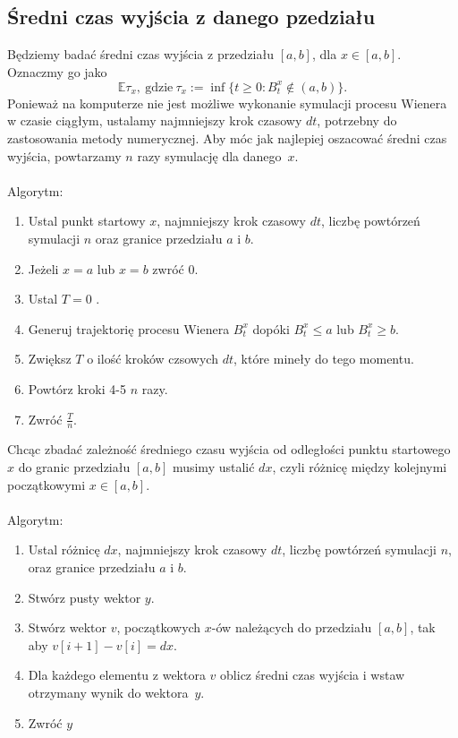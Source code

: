 \documentclass{article}
\theoremstyle{break}
\numberwithin{equation}{subsection}
\numberwithin{figure}{section}
\begin{document}
\subsection{Średni czas wyjścia z danego pzedziału}

Będziemy badać średni czas wyjścia z  przedziału $[a,b]$, dla $x\in[a,b]$. Oznaczmy go jako $$\mathbb{E}\tau_x \mathrm{,~gdzie~}\tau_x:=\inf\{t\geq0:B_t^x\notin(a,b)\}.$$ 
Ponieważ na komputerze nie jest możliwe wykonanie symulacji procesu Wienera w czasie ciągłym, ustalamy najmniejszy krok czasowy $dt$, potrzebny do zastosowania metody numerycznej. Aby móc jak najlepiej oszacować średni czas wyjścia, powtarzamy $n$ razy symulację dla danego~$x$.\\ \\
Algorytm:
\begin{enumerate}
	\item Ustal punkt startowy $x$, najmniejszy krok czasowy $dt$, liczbę powtórzeń symulacji $n$ oraz granice przedziału $a$ i $b$.
	\item Jeżeli $x=a$ lub $x=b$ zwróć 0.
	\item Ustal $T=0$ .
	\item Generuj trajektorię procesu Wienera $B_t^x$ dopóki $B_t^x\leq a$ lub $B_t^x\geq b$.
	\item Zwiększ $T$ o ilość kroków czsowych $dt$, które mineły do tego momentu.
	\item Powtórz kroki 4-5 $n$ razy.
	\item Zwróć $\frac{T}{n}$.
\end{enumerate}
Chcąc zbadać zależność średniego czasu wyjścia od odległości punktu startowego $x$ do granic przedziału $[a,b]$ musimy ustalić $dx$, czyli różnicę między kolejnymi początkowymi $x \in [a,b]$.\\ \\ 
Algorytm:
\begin{enumerate}
	\item Ustal różnicę $dx$, najmniejszy krok czasowy $dt$, liczbę powtórzeń symulacji $n$, oraz granice przedziału $a$ i $b$.
	\item Stwórz pusty wektor $y$.
	\item Stwórz wektor $v$, początkowych $x$-ów należących do przedziału $[a,b]$, tak aby $v[i+1]-v[i]=dx$.
	\item Dla każdego elementu z wektora $v$ oblicz średni czas wyjścia i wstaw otrzymany wynik do wektora~$y$.
	\item Zwróć $y$
\end{enumerate}
\end{document}
